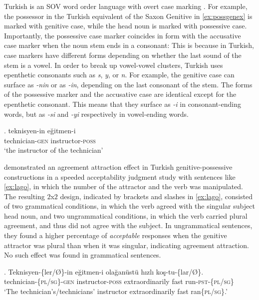 \documentclass[apacite,linguex]{glossa}\usepackage[]{graphicx}\usepackage[]{color}
\begin{document}
Turkish is an SOV word order language with overt case marking \citep{GokselKerslake:2005,Kornfilt:2011,Kornfilt:2013}. For example, the possessor in the Turkish equivalent of the Saxon Genitive in \ref{ex:possgenex} is marked with genitive case, while the head noun is marked with possessive case. 
Importantly, the possessive case marker coincides in form with the accusative case marker when the noun stem ends in a consonant: 
This is because in Turkish, case markers have different forms depending on whether the last sound of the stem is a vowel. In order to break up vowel-vowel clusters, Turkish uses epenthetic consonants such as \textit{s}, \textit{y}, or \textit{n}.  For example, the genitive case can surface as \textit{-nin} or as \textit{-in}, depending on the last consonant of the stem. The forms of the possessive marker and the accusative case are identical except for the epenthetic consonant. This means that they surface as \textit{-i} in consonant-ending words, but as \textit{-si} and \textit{-yi} respectively in vowel-ending words. 

\ex. \label{ex:possgenex}
\gll teknisyen-in eğitmen-i \\
    technician-\textsc{gen} instructor-\textsc{poss} \\
\glt `the instructor of the technician'


\citet{LagoEtAl:2019} demonstrated an agreement attraction effect in Turkish genitive-possessive constructions in a speeded acceptability judgment study with sentences like \ref{ex:lago}, in which the number of the attractor and the verb was manipulated. The resulting $2$x$2$ design, indicated by brackets and slashes in \ref{ex:lago}, consisted of two grammatical conditions, in which the verb agreed with the singular subject head noun, and two ungrammatical conditions, in which the verb carried plural agreement, and thus did not agree with the subject. In ungrammatical sentences, they found a higher percentage of \textit{acceptable} responses when the genitive attractor was plural than when it was singular, indicating agreement attraction. No such effect was found in grammatical sentences.


\ex. \label{ex:lago}
\gll Teknisyen-\{ler/\O\}-in e\u{g}itmen-i ola\u{g}an{\"u}st{\"u} h{\i}zl{\i} ko\c{s}-tu-\{lar/\O\}.\\
technician-\{\textsc{pl}/\textsc{sg}\}-\textsc{gen} instructor-\textsc{poss} extraordinarily fast run-\textsc{pst}-\{\textsc{pl}/\textsc{sg}\}\\
\glt `The technician's/technicians' instructor extraordinarily fast ran\{\textsc{pl}/\textsc{sg}\}.'
\end{document}

